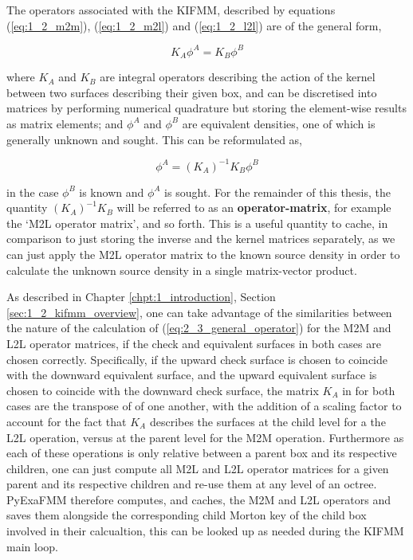 The operators associated with the \gls{KIFMM}, described by equations
(\ref{eq:1_2_m2m}), (\ref{eq:1_2_m2l}) and (\ref{eq:1_2_l2l}) are of the general
form,

\begin{equation}
    K_A\phi^A = K_B\phi^B
\end{equation}

where $K_A$ and $K_B$ are integral operators describing the action of the kernel
between two surfaces describing their given box, and can be discretised into
matrices by performing numerical quadrature but storing the element-wise results
as matrix elements; and $\phi^A$ and $\phi^B$ are equivalent densities, one of
which is generally unknown and sought. This can be reformulated as,

\begin{equation}
    \phi^A = (K_A)^{-1}K_B\phi^B
    \label{eq:2_3_general_operator}
\end{equation}

in the case $\phi^B$ is known and $\phi^A$ is sought. For the remainder of this
thesis, the quantity $(K_A)^{-1}K_B$ will be referred to as an \textbf{\gls{operator-matrix}},
for example the `M2L operator matrix', and so forth. This is a useful quantity
to cache, in comparison to just storing the inverse and the kernel matrices separately,
as we can just apply the M2L operator matrix to the known source density in order
to calculate the unknown source density in a single matrix-vector product.

As described in Chapter \ref{chpt:1_introduction}, Section \ref{sec:1_2_kifmm_overview}, one
can take advantage of the similarities between the nature of the calculation of
(\ref{eq:2_3_general_operator}) for the \gls{M2M} and \gls{L2L} operator matrices, if
the check and equivalent surfaces in both cases are chosen correctly. Specifically,
if the upward check surface is chosen to coincide with the downward equivalent
surface, and the upward equivalent surface is chosen to coincide with the
downward check surface, the matrix $K_A$ in for both cases are the transpose of
of one another, with the addition of a scaling factor to account for the fact
that $K_A$ describes the surfaces at the child level for a the \gls{L2L} operation,
versus at the parent level for the \gls{M2M} operation. Furthermore as each of these
operations is only relative between a parent box and its respective children, one
can just compute all M2L and L2L operator matrices for a given parent and its
respective children and re-use them at any level of an octree. \gls{PyExaFMM} therefore
computes, and caches, the M2M and L2L operators and saves them alongside the
corresponding child Morton \gls{key} of the child box involved in their calcualtion,
 this can be looked up as needed during the \gls{KIFMM} main loop.

